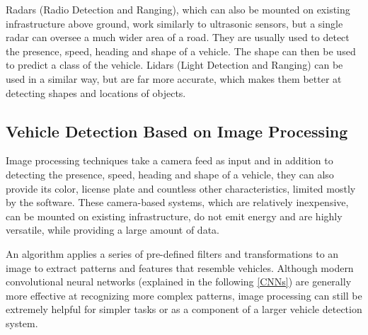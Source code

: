 Radars (Radio Detection and Ranging), which can also be mounted on existing
infrastructure above ground, work similarly to ultrasonic sensors, but a single
radar can oversee a much wider area of a road.\cite{RadarSensors} They are
usually used to detect the presence, speed, heading and shape of a vehicle. The
shape can then be used to predict a class of the vehicle. Lidars (Light
Detection and Ranging) can be used in a similar way, but are far more accurate,
which makes them better at detecting shapes and locations of objects.



\subsection*{Vehicle Detection Based on Image Processing}







Image processing techniques take a camera feed as input and in addition to
detecting the presence, speed, heading and shape of a vehicle, they can
also provide its color, license plate and countless other characteristics,
limited mostly by the software. These camera-based systems, which are
relatively inexpensive, can be mounted on existing infrastructure, do not emit
energy and are highly versatile, while providing a large amount of data.

An algorithm applies a series of pre-defined filters and transformations to an
image to extract patterns and features that resemble vehicles. Although modern
convolutional neural networks (explained in the following \autoref{CNNs}) are generally
more effective at recognizing more complex patterns, image processing can still
be extremely helpful for simpler tasks or as a component of a larger vehicle
detection system.

